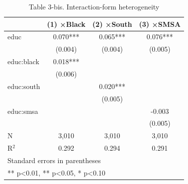 \begin{table}[htbp]
\centering
\caption{Table 3-bis. Interaction-form heterogeneity}
\begin{tabular}{lccc}
\hline\hline
 & (1) ×Black & (2) ×South & (3) ×SMSA \\
\hline
educ & 0.070*** & 0.065*** & 0.076*** \\
 & (0.004) & (0.004) & (0.005) \\
educ:black & 0.018*** &  &  \\
 & (0.006) &  &  \\
educ:south &  & 0.020*** &  \\
 &  & (0.005) &  \\
educ:smsa &  &  & -0.003 \\
 &  &  & (0.005) \\
\hline
N & 3,010 & 3,010 & 3,010 \\
R$^2$ & 0.292 & 0.294 & 0.291 \\
\hline\hline
\multicolumn{4}{l}{\footnotesize Standard errors in parentheses} \\
\multicolumn{4}{l}{\footnotesize *** p<0.01, ** p<0.05, * p<0.10} \\
\end{tabular}
\end{table}